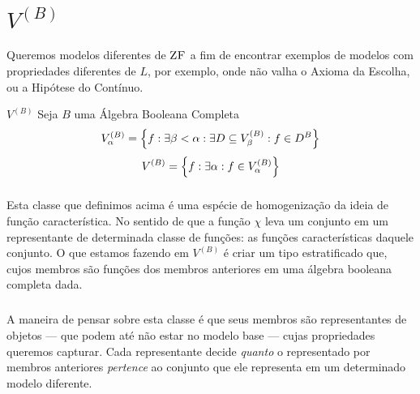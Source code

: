 \chapter{$V^{(B)}$}
    \cls
    \paragraph{}
        Queremos modelos diferentes de $\text{\sc ZF}$
        a fim de encontrar exemplos de modelos 
        com propriedades diferentes de $L$, 
        por exemplo, onde não valha o Axioma 
        da Escolha, ou a Hipótese do Contínuo.
    \begin{definition}{$ V^{(B)} $}
        Seja $B$ uma Álgebra Booleana Completa
        $$ V^{(B)}_{\alpha} = \SET{ f : \exists\beta<\alpha:\exists D\subseteq V^{(B)}_{\beta} : f\in D^B } $$
        $$ V^{(B)} = \SET{f : \exists\alpha: f\in V^{(B)}_{\alpha}} $$
    \end{definition}
    \paragraph{}
        Esta classe que definimos acima é 
        uma espécie de homogenização da 
        ideia de função característica. No 
        sentido de que a função $\chi$ 
        leva um conjunto em um representante
        de determinada classe de funções: as 
        funções características daquele 
        conjunto. O que estamos fazendo em 
        $V^{(B)}$ é criar um tipo 
        estratificado que, cujos membros são 
        funções dos membros anteriores em uma 
        álgebra booleana completa dada.
    \paragraph{}
        A maneira de pensar sobre esta classe
        é que seus membros são representantes 
        de objetos --- que podem até não estar
        no modelo base --- cujas propriedades 
        queremos capturar. Cada representante
        decide \textit{quanto} o representado 
        por membros anteriores \textit{pertence}
        ao conjunto que ele representa em um
        determinado modelo diferente.
